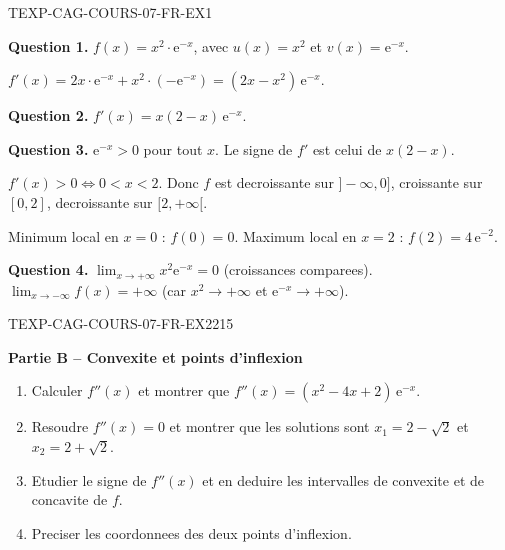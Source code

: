 \begin{corrige}{TEXP-CAG-COURS-07-FR-EX1}

\textbf{Question 1.} $f(x) = x^2 \cdot \mathrm{e}^{-x}$, avec $u(x) = x^2$ et $v(x) = \mathrm{e}^{-x}$.

$f'(x) = 2x \cdot \mathrm{e}^{-x} + x^2 \cdot (-\mathrm{e}^{-x}) = (2x - x^2)\,\mathrm{e}^{-x}$.

\textbf{Question 2.} $f'(x) = x(2-x)\,\mathrm{e}^{-x}$.

\textbf{Question 3.} $\mathrm{e}^{-x} > 0$ pour tout $x$. Le signe de $f'$ est celui de $x(2-x)$.

$f'(x) > 0 \iff 0 < x < 2$. Donc $f$ est decroissante sur $]-\infty, 0]$, croissante sur $[0, 2]$, decroissante sur $[2, +\infty[$.

Minimum local en $x = 0$ : $f(0) = 0$. Maximum local en $x = 2$ : $f(2) = 4\,\mathrm{e}^{-2}$.

\textbf{Question 4.} $\lim_{x \to +\infty} x^2 \mathrm{e}^{-x} = 0$ (croissances comparees). $\lim_{x \to -\infty} f(x) = +\infty$ (car $x^2 \to +\infty$ et $\mathrm{e}^{-x} \to +\infty$).

\end{corrige}

\bigskip


\begin{exercice}{TEXP-CAG-COURS-07-FR-EX2}{2}{15}

\textbf{Partie B -- Convexite et points d'inflexion}

\begin{enumerate}
  \item Calculer $f''(x)$ et montrer que $f''(x) = (x^2 - 4x + 2)\,\mathrm{e}^{-x}$.
  \item Resoudre $f''(x) = 0$ et montrer que les solutions sont $x_1 = 2 - \sqrt{2}$ et $x_2 = 2 + \sqrt{2}$.
  \item Etudier le signe de $f''(x)$ et en deduire les intervalles de convexite et de concavite de $f$.
  \item Preciser les coordonnees des deux points d'inflexion.
\end{enumerate}

\end{exercice}

